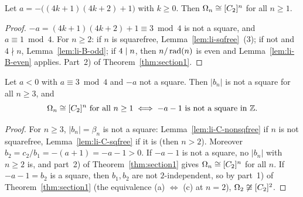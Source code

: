 \begin{theorem}
  \label{thm:li-B}
  \leanok
  Let $a = -\bigl((4k+1)(4k+2) + 1\bigr)$ with $k \ge 0$. Then $\Omega_n \cong [C_2]^{n}$ for all
  $n \ge 1$.
\end{theorem}
\begin{proof}
  \leanok
  $-a = (4k+1)(4k+2) + 1 \equiv 3 \bmod 4$ is not a square, and $a \equiv 1 \bmod 4$. For
  $n \ge 2$: if $n$ is squarefree, Lemma~\ref{lem:li-sqfree}~(3); if not and $4 \nmid n$,
  Lemma~\ref{lem:li-B-odd}; if $4 \mathrel{\mid} n$, then $n/\operatorname{rad}(n)$ is even and Lemma~\ref{lem:li-B-even}
  applies. Part~2) of Theorem~\ref{thm:section1}.
\end{proof}

\begin{theorem}
  \label{thm:li-C}
  \leanok
  Let $a < 0$ with $a \equiv 3 \bmod 4$ and $-a$ not a square. Then $|b_n|$ is not a square for
  all $n \ge 3$, and
  \[ \Omega_n \cong [C_2]^{n} \text{ for all } n \ge 1 \iff -a - 1 \text{ is not a square in } \mathbb{Z}. \]
\end{theorem}
\begin{proof}
  \leanok
  For $n \ge 3$, $|b_n| = \beta_n$ is not a square: Lemma~\ref{lem:li-C-nonsqfree} if $n$ is not
  squarefree, Lemma~\ref{lem:li-C-sqfree} if it is (then $n > 2$). Moreover
  $b_2 = c_2/b_1 = -(a+1) = -a - 1 > 0$. If $-a - 1$ is not a square, no $|b_n|$ with $n \ge 2$
  is, and part~2) of Theorem~\ref{thm:section1} gives $\Omega_n \cong [C_2]^{n}$ for all $n$. If
  $-a - 1 = b_2$ is a square, then $b_1, b_2$ are not $2$-independent, so by part~1) of
  Theorem~\ref{thm:section1} (the equivalence (a) $\Leftrightarrow$ (c) at $n = 2$),
  $\Omega_2 \not\cong [C_2]^{2}$.
\end{proof}

